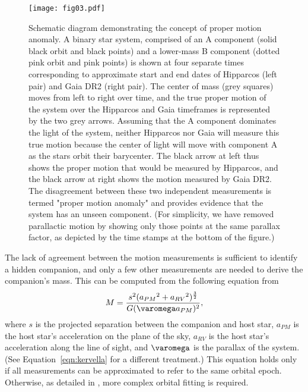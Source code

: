 \documentclass[twocolumn,tighten,twocolappendix]{aastex631}
\begin{document}
\begin{figure}
\texttt{[image: fig03.pdf]}
\caption{Schematic diagram demonstrating the concept of proper motion anomaly. A binary star system, comprised of an A component (solid black orbit and black points) and a lower-mass B component (dotted pink orbit and pink points) is shown at four separate times corresponding to approximate start and end dates of Hipparcos (left pair) and Gaia DR2 (right pair). The center of mass (grey squares) moves from left to right over time, and the true proper motion of the system over the Hipparcos and Gaia timeframes is represented by the two grey arrows. Assuming that the A component dominates the light of the system, neither Hipparcos nor Gaia will measure this true motion because the center of light will move with component A as the stars orbit their barycenter. The black arrow at left thus shows the proper motion that would be measured by Hipparcos, and the black arrow at right shows the motion measured by Gaia DR2. The disagreement between these two independent measurements is termed "proper motion anomaly" and provides evidence that the system has an unseen component. (For simplicity, we have removed parallactic motion by showing only those points at the same parallax factor, as depicted by the time stamps at the bottom of the figure.)
\label{fig:pm_anomaly}}
\end{figure}

The lack of agreement between the motion measurements is sufficient to identify a hidden companion, and only a few other measurements are needed to derive the companion's mass. This can be computed from the following equation from \cite{brandt2019}
\begin{equation}
    M = \frac{{s^2}({a_{PM}}^2+{a_{RV}}^2)^{\frac{3}{2}}}{G({\varomega}a_{PM})^2}\label{eqn:accleration},
\end{equation}
where $s$ is the projected separation between the companion and host star, $a_{PM}$ is the host star's acceleration on the plane of the sky, $a_{RV}$ is the host star's acceleration along the line of sight, and $\varomega$ is the parallax of the system. (See Equation~\ref{eqn:kervella} for a different treatment.) This equation holds only if all measurements can be approximated to refer to the same orbital epoch. Otherwise, as detailed in \cite{brandt2019}, more complex orbital fitting is required.
\end{document}
